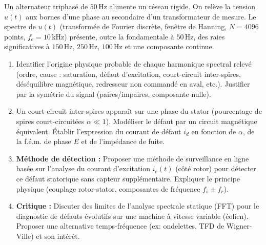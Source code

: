 \documentclass[11pt]{article}
\begin{document}
\begin{exercice}
Un alternateur triphasé de $50\,\text{Hz}$ alimente un réseau rigide. On relève la tension $u(t)$ aux bornes d'une phase au secondaire d'un transformateur de mesure. Le spectre de $u(t)$ (transformée de Fourier discrète, fenêtre de Hanning, $N=4096$ points, $f_e=10\,\text{kHz}$) présente, outre la fondamentale à $50\,\text{Hz}$, des raies significatives à $150\,\text{Hz}$, $250\,\text{Hz}$, $100\,\text{Hz}$ et une composante continue.
\begin{enumerate}
    \item Identifier l'origine physique probable de chaque harmonique spectral relevé (ordre, cause : saturation, défaut d'excitation, court-circuit inter-spires, déséquilibre magnétique, redresseur non commandé en aval, etc.). Justifier par la symétrie du signal (paires/impaires, composante nulle).
    \item Un court-circuit inter-spires apparaît sur une phase du stator (pourcentage de spires court-circuitées $\alpha \ll 1$). Modéliser le défaut par un circuit magnétique équivalent. Établir l'expression du courant de défaut $i_d$ en fonction de $\alpha$, de la f.é.m. de phase $E$ et de l'impédance de fuite.
    \item \textbf{Méthode de détection :} Proposer une méthode de surveillance en ligne basée sur l'analyse du courant d'excitation $i_e(t)$ (côté rotor) pour détecter ce défaut statorique sans capteur supplémentaire. Expliquer le principe physique (couplage rotor-stator, composantes de fréquence $f_s \pm f_r$).
    \item \textbf{Critique :} Discuter des limites de l'analyse spectrale statique (FFT) pour le diagnostic de défauts évolutifs sur une machine à vitesse variable (éolien). Proposer une alternative temps-fréquence (ex: ondelettes, TFD de Wigner-Ville) et son intérêt.
\end{enumerate}
\end{exercice}
\end{document}
